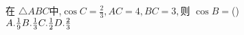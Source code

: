 \documentclass[class=ctexart,crop=false]{standalone}
\begin{document}
在 $\triangle ABC$中,$\cos C=\frac{2}{3},AC=4,BC=3,$则 $\cos B= $\hfill (\qquad)\\
$A. \frac{1}{9}\hfill B. \frac{1}{3}\hfill 
C. \frac{1}{2}\hfill D. \frac{2}{3}\hfill\quad$
\end{document}
